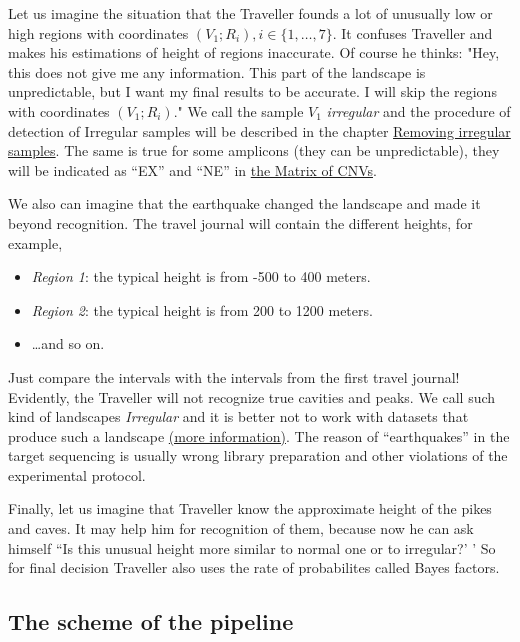 \documentclass{article}
\begin{document}
Let us imagine the situation that the Traveller founds a lot of unusually low or high regions with coordinates $(V_1; R_i), i \in \{1,\ldots,7\}$. It confuses Traveller and makes his estimations of height of regions inaccurate. Of course he thinks: "Hey, this does not give me any information. This part of the landscape is unpredictable, but I want my final results to be accurate. I will skip the regions with coordinates $(V_1; R_i)$." We call the sample $V_1$ {\it irregular} and the procedure of detection of Irregular samples will be described in the chapter \hyperlink{removeIrrSamples}{Removing irregular samples}. The same is true for some amplicons (they can be unpredictable), they will be indicated as ``EX'' and ``NE'' in \hyperlink{fileWithCNVs}{the Matrix of CNVs}. 

We also can imagine that the earthquake changed the landscape and made it beyond recognition. The travel journal will contain the different heights, for example,   

\begin{itemize}
\item {\it Region 1}: the typical height is from -500 to 400 meters.

\item {\it Region 2}: the typical height is from 200 to 1200 meters.

\item \ldots and so on.
\end{itemize}

Just compare the intervals with the intervals from the first travel journal! Evidently, the Traveller will not recognize true cavities and peaks. We call such kind of landscapes {\it Irregular} and it is better not to work with datasets that produce such a landscape \hyperlink{averageRobustVariance}{(more information)}. The reason of ``earthquakes'' in the target sequencing is usually wrong library preparation and other violations of the experimental protocol.

Finally, let us imagine that Traveller know the approximate height of the pikes and caves. It may help him for recognition of them, because now he can ask himself ``Is this unusual height more similar to normal one or to irregular?' ' So for final decision Traveller also uses the rate of probabilites called Bayes factors.


\subsection{The scheme of the pipeline}
\end{document}
